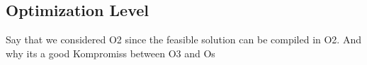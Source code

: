 \subsection{Optimization Level}
Say that we considered O2 since the feasible solution can be compiled in O2.
And why its a good Kompromiss between O3 and Os